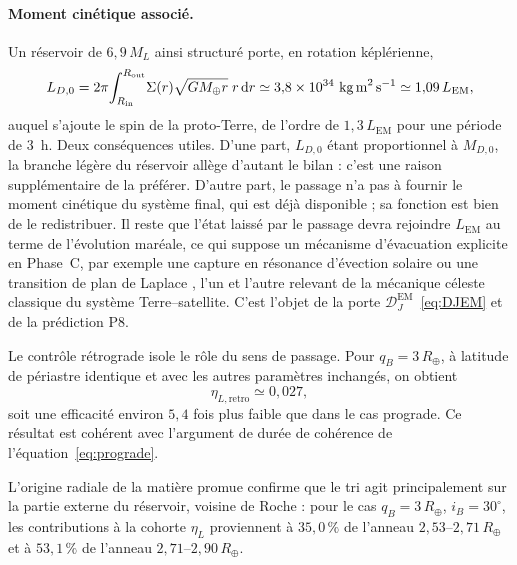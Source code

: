 \documentclass[11pt,a4paper,openany]{report}
\newcommand{\Mt}{M_{\oplus}}
\newcommand{\Rt}{R_{\oplus}}
\newcommand{\dd}{\mathrm{d}}
\begin{document}
\paragraph{Moment cinétique associé.}
Un réservoir de $6{,}9\,M_L$ ainsi structuré porte, en rotation képlérienne,
\begin{equation}
L_{D,0}=2\pi\!\int_{R_{\mathrm{in}}}^{R_{\mathrm{out}}}\!\Sigma(r)\sqrt{G\Mt r}\;r\,\dd r
\simeq3{,}8\times10^{34}\ \text{kg\,m}^2\,\text{s}^{-1}\simeq1{,}09\,L_{\mathrm{EM}},
\label{eq:LD-reservoir}
\end{equation}
auquel s'ajoute le spin de la proto-Terre, de l'ordre de $1{,}3\,L_{\mathrm{EM}}$ pour une période
de $3$~h. Deux conséquences utiles. D'une part, $L_{D,0}$ étant proportionnel à $M_{D,0}$, la
branche légère du réservoir allège d'autant le bilan : c'est une raison supplémentaire de la
préférer. D'autre part, le passage n'a pas à fournir le moment cinétique du système final, qui est
déjà disponible ; sa fonction est bien de le redistribuer. Il reste que l'état laissé par le
passage devra rejoindre $L_{\mathrm{EM}}$ au terme de l'évolution maréale, ce qui suppose un
mécanisme d'évacuation explicite en Phase~C, par exemple une capture en résonance d'évection
solaire ou une transition de plan de Laplace \cite{MurrayDermott1999,TremaineTouma2009}, l'un et
l'autre relevant de la mécanique céleste classique du système Terre--satellite. C'est
l'objet de la porte $\mathcal{D}_J^{\mathrm{EM}}$~\eqref{eq:DJEM} et de la prédiction P8.

Le contrôle rétrograde isole le rôle du sens de passage. Pour $q_B=3\,\Rt$, à latitude de
périastre identique et avec les autres paramètres inchangés, on obtient
\begin{equation}
\eta_{L,\mathrm{retro}}\simeq0{,}027,
\label{eq:retro-pilote}
\end{equation}
soit une efficacité environ $5{,}4$ fois plus faible que dans le cas prograde. Ce résultat est cohérent
avec l'argument de durée de cohérence de l'équation~\eqref{eq:prograde}.

L'origine radiale de la matière promue confirme que le tri agit principalement sur la partie externe
du réservoir, voisine de Roche : pour le cas $q_B=3\,\Rt$, $i_B=30^\circ$, les contributions à la
cohorte $\eta_L$ proviennent à $35{,}0\,\%$ de l'anneau $2{,}53$--$2{,}71\,\Rt$ et à
$53{,}1\,\%$ de l'anneau $2{,}71$--$2{,}90\,\Rt$.
\end{document}
